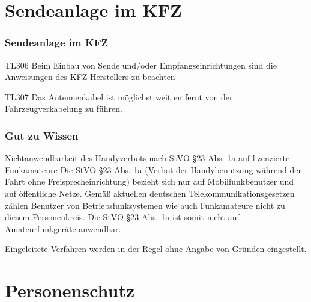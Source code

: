 \section*{Sendeanlage im KFZ}

\begin{frame}
  \frametitle{Sendeanlage im KFZ}
  \begin{center}
    \begin{exampleblock}{TL306}
      Beim Einbau von Sende und/oder Empfangseinrichtungen sind die Anweisungen des KFZ-Herstellers zu beachten
    \end{exampleblock}
    \begin{exampleblock}{TL307}
      Das Antennenkabel ist möglichst weit entfernt von der Fahrzeugverkabelung zu führen.
    \end{exampleblock}
  \end{center}
\end{frame}

\begin{frame}
  \frametitle{Gut zu Wissen}
  \begin{center}
    \begin{block}{Nichtanwendbarkeit des Handyverbots nach StVO §23 Abs. 1a auf lizenzierte Funkamateure}
      Die StVO §23 Abs. 1a (Verbot der Handybenutzung während der Fahrt ohne Freisprecheinrichtung) bezieht sich nur auf Mobilfunkbenutzer und auf öffentliche Netze. Gemäß aktuellen deutschen Telekommunikationsgesetzen zählen Benutzer von Betriebsfunksystemen wie auch Funkamateure nicht zu diesem Personenkreis. Die StVO §23 Abs. 1a ist somit nicht auf Amateurfunkgeräte anwendbar.
    \end{block}
  \end{center}
  Eingeleitete \href{http://www.dl7vdx.com/amateurfunk-im-auto-teil1/}{\ExternalLink Verfahren} werden in der Regel ohne Angabe von Gründen \href{http://www.dl7vdx.com/teil-2-funk-im-auto/}{\ExternalLink eingestellt}.
\end{frame}

\section*{Personenschutz}

